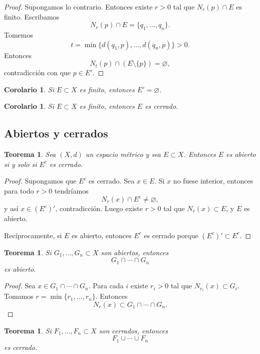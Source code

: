 \documentclass[12pt]{article}
\theoremstyle{definition}
\theoremstyle{plain}
\newtheorem{theorem}[definition]{Teorema}
\newtheorem{corollary}[definition]{Corolario}
\theoremstyle{remark}
\begin{document}
\begin{proof}
Supongamos lo contrario.
Entonces existe $r>0$ tal que $N_r(p)\cap E$ es finito.
Escribamos
\[
N_r(p)\cap E=\{q_1,\dots,q_n\}.
\]
Tomemos
\[
t=\min\{d(q_1,p),\dots,d(q_n,p)\}>0.
\]
Entonces
\[
N_t(p)\cap(E\setminus\{p\})=\varnothing,
\]
contradicción con que $p\in E'$.
\end{proof}

\begin{corollary}
Si $E\subset X$ es finito, entonces $E'=\varnothing$.
\end{corollary}

\begin{corollary}
Si $E\subset X$ es finito, entonces $E$ es cerrado.
\end{corollary}

\subsection*{Abiertos y cerrados}

\begin{theorem}
Sea $(X,d)$ un espacio métrico y sea $E\subset X$. Entonces $E$ es abierto si y solo si $E^c$ es cerrado.
\end{theorem}

\begin{proof}
Supongamos que $E^c$ es cerrado.
Sea $x\in E$.
Si $x$ no fuese interior, entonces para todo $r>0$ tendríamos
\[
N_r(x)\cap E^c\neq\varnothing,
\]
y así $x\in (E^c)'$, contradicción.
Luego existe $r>0$ tal que $N_r(x)\subset E$, y $E$ es abierto.

Recíprocamente, si $E$ es abierto, entonces $E^c$ es cerrado porque $(E^c)' \subset E^c$.
\end{proof}

\begin{theorem}
Si $G_1,\dots,G_n\subset X$ son abiertos, entonces
\[
G_1\cap\cdots\cap G_n
\]
es abierto.
\end{theorem}

\begin{proof}
Sea $x\in G_1\cap\cdots\cap G_n$.
Para cada $i$ existe $r_i>0$ tal que $N_{r_i}(x)\subset G_i$.
Tomamos $r=\min\{r_1,\dots,r_n\}$.
Entonces
\[
N_r(x)\subset G_1\cap\cdots\cap G_n.
\]
\end{proof}

\begin{theorem}
Si $F_1,\dots,F_n\subset X$ son cerrados, entonces
\[
F_1\cup\cdots\cup F_n
\]
es cerrado.
\end{theorem}
\end{document}
